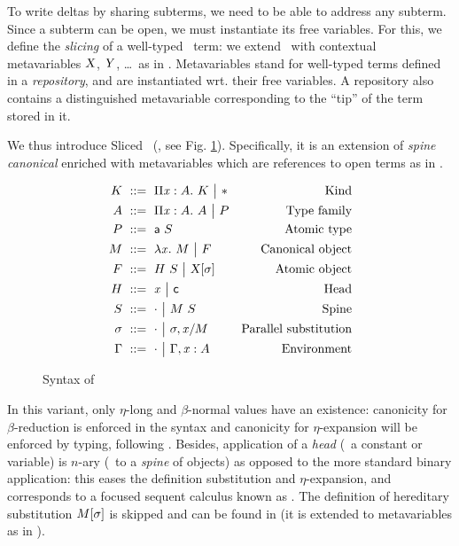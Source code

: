 \documentclass{llncs}
\begin{document}
To write deltas by sharing subterms, we need to be able to address any
subterm. Since a subterm can be open, we must instantiate its free
variables. For this, we define the \emph{slicing} of a well-typed \LF\
term: we extend \LF\ with contextual metavariables $\text{\textsl{X}}$, $\text{\textsl{Y}}$, \ldots\ as in \cite{nanevski2008contextual}. Metavariables stand
for well-typed terms defined in a \emph{repository}, and are
instantiated wrt. their free variables. A repository also contains a
distinguished metavariable corresponding to the ``tip'' of the term
stored in it.

We thus introduce Sliced \LF\ (\SLF, see
Fig. \ref{fig:syntax-LF}). Specifically, it is an extension of
\emph{spine canonical \LF} \cite{pfenning2007term} enriched with
metavariables which are references to open terms as in
\cite{nanevski2008contextual}.

\begin{figure}\centering
  \begin{align*}
    K &\ ::=\  \Pi{\ensuremath{\text{\textit{x}}}}:{A}.\  K \ {\big|}\  \mathsf{*} &
    \text{Kind}\\
    A &\ ::=\  \Pi{\ensuremath{\text{\textit{x}}}}:{A}.\  A \ {\big|}\  P &
    \text{Type family} \\
    P &\ ::=\  {\text{\textsf{a}}}\  S &
    \text{Atomic type} \\
    M &\ ::=\  \lambda{\ensuremath{\text{\textit{x}}}}.\  M \ {\big|}\  F &
    \text{Canonical object} \\
    F &\ ::=\  {H}\  S \ {\big|}\  {\text{\textsl{X}}}[{\sigma}] &
    \text{Atomic object} \\
    H &\ ::=\  \text{\textit{x}} \ {\big|}\  \text{\textsf{c}} &
    \text{Head}\\
    S &\ ::=\  \cdot \ {\big|}\  {M}\ {S} &
    \text{Spine}\\
    \sigma &\ ::=\  \cdot \ {\big|}\  {\sigma},{{\text{\textit{x}}}/{M}} &
    \text{Parallel substitution} \\
    \Gamma &\ ::=\  \cdot \ {\big|}\  {\Gamma},{{\text{\textit{x}}}:{A}} &
    \text{Environment}
  \end{align*}
  \caption{Syntax of \SLF}
  \label{fig:syntax-LF}
\end{figure}

In this variant, only $\eta$-long and $\beta$-normal values have an
existence: canonicity for $\beta$-reduction is enforced in the syntax
and canonicity for $\eta$-expansion will be enforced by typing,
following \cite{hl07mechanizing}. Besides, application of a
\emph{head} (\ie\ a constant or variable) is $n$-ary (\ie\ to a
\emph{spine} of objects) as opposed to the more standard binary
application: this eases the definition substitution and
$\eta$-expansion, and corresponds to a focused sequent calculus known
as \sysname{LJT} \cite{herbelin1995λ}. The definition of hereditary
substitution ${M}[{\sigma}]$ is skipped and can be found in
\cite{pfenning2007term} (it is extended to metavariables as in
\cite{nanevski2008contextual}).
\end{document}
